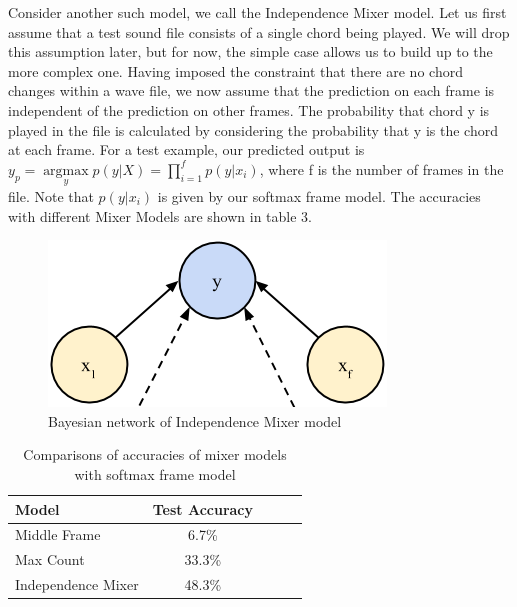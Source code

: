 \documentclass{article}
\begin{document}
Consider another such model, we call the Independence Mixer model. Let us first assume that a test sound file consists of a single chord being played. We will drop this assumption later, but for now, the simple case allows us to build up to the more complex one. Having imposed the constraint that there are no chord changes within a wave file, we now assume that the prediction on each frame is independent of the prediction on other frames. The probability that chord y is played in the file is calculated by considering the probability that y is the chord at each frame.  For a test example, our predicted output is $y_p = \underset{y}{\operatorname{argmax}} p(y | X) = \prod_{i=1}^fp(y | x_i)$, where f is the number of frames in the file. Note that $p(y | x_i)$ is given by our softmax frame model. The accuracies with different Mixer Models are shown in table 3.
\begin{figure}[ht]
\vskip 0.2in
\begin{center}
\centerline{\includegraphics[width=\columnwidth]{naive}}
\caption{Bayesian network of Independence Mixer model}
\label{icml-historical}
\end{center}
\vskip -0.2in
\end{figure}
\begin{table}[t]
\caption{Comparisons of accuracies of mixer models with softmax frame model}
\label{mfccvschroma}
\vskip 0.15in
\begin{center}
\begin{small}
\begin{sc}
\begin{tabular}{lcccr}
\hline
\abovespace\belowspace
Model & Test Accuracy \\
\hline
\abovespace
Middle Frame    & 6.7\%\\
Max Count & 33.3\%\\
Independence Mixer & 48.3\%\\
\hline
\end{tabular}
\end{sc}
\end{small}
\end{center}
\vskip -0.1in
\end{table}
\end{document}
